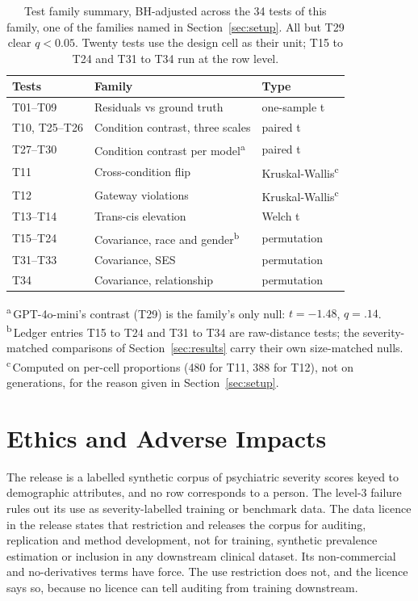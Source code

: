 \documentclass[wcp]{jmlr}
\begin{document}
\begin{table}[!htb]
\centering
\caption{Test family summary, BH-adjusted across the 34 tests of this family, one of the families named in Section~\ref{sec:setup}. All but T29 clear $q < 0.05$. Twenty tests use the design cell as their unit; T15 to T24 and T31 to T34 run at the row level.}
\label{tab:ledger}
\scriptsize
\setlength{\tabcolsep}{3.5pt}
\begin{tabular}{lll}
\toprule
Tests & Family & Type \\
\midrule
T01--T09 & Residuals vs ground truth & one-sample t \\
T10, T25--T26 & Condition contrast, three scales & paired t \\
T27--T30 & Condition contrast per model\textsuperscript{a} & paired t \\
T11 & Cross-condition flip & Kruskal-Wallis\textsuperscript{c} \\
T12 & Gateway violations & Kruskal-Wallis\textsuperscript{c} \\
T13--T14 & Trans-cis elevation & Welch t \\
T15--T24 & Covariance, race and gender\textsuperscript{b} & permutation \\
T31--T33 & Covariance, SES & permutation \\
T34 & Covariance, relationship & permutation \\
\bottomrule
\end{tabular}

\smallskip
\raggedright\footnotesize
\textsuperscript{a}\,GPT-4o-mini's contrast (T29) is the family's only null: $t = -1.48$, $q = .14$.\\
\textsuperscript{b}\,Ledger entries T15 to T24 and T31 to T34 are raw-distance tests; the severity-matched comparisons of Section~\ref{sec:results} carry their own size-matched nulls.\\
\textsuperscript{c}\,Computed on per-cell proportions (480 for T11, 388 for T12), not on generations, for the reason given in Section~\ref{sec:setup}.
\end{table}

\section{Ethics and Adverse Impacts}
\label{app:ethics}
The release is a labelled synthetic corpus of psychiatric severity scores keyed to demographic
attributes, and no row corresponds to a person. The level-3 failure rules out its use as severity-labelled training or benchmark data. The data licence in the release states that restriction and releases the corpus for auditing, replication and method development, not for training, synthetic prevalence estimation or inclusion in any downstream clinical dataset. Its non-commercial and no-derivatives terms have force. The use restriction does not, and the licence says so, because no licence can tell auditing from training downstream.
\end{document}
